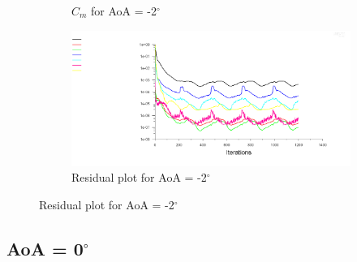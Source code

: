 \begin{figure}[H]
\begin{subfigure}[b]{0.5\textwidth}
    \caption{$C_m$ for AoA = -2$^\circ$}
    \label{fig:aoa_-2_cm}
  \end{subfigure}
  \begin{subfigure}[b]{0.5\textwidth}
    \includegraphics[width=\textwidth]{-2_deg/AoA_-2_resid.png}
    \caption{Residual plot for AoA = -2$^\circ$}
    \label{fig:aoa_-2_resid}
  \end{subfigure}
\end{figure}

\subsection*{AoA = 0$^\circ$}

